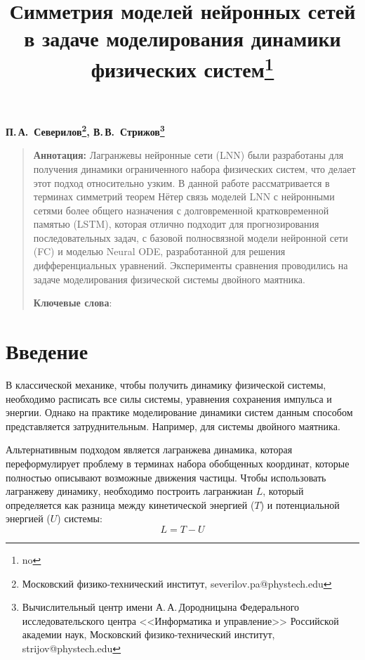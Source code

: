 \documentclass[12pt]{article}
\begin{document}
	\title{Симметрия моделей нейронных сетей в задаче моделирования динамики физических систем\thanks{no}}
	\date{}
	\author{}
	\maketitle
	
	\begin{center}
		\bf
		П.\,А.~Северилов\footnote{Московский физико-технический институт, severilov.pa@phystech.edu}, 
		В.\,В.~Стрижов\footnote{Вычислительный центр имени А.\,А.\,Дородницына Федерального исследовательского центра <<Информатика и управление>> Российской академии наук, Московский физико-технический институт, strijov@phystech.edu}
	\end{center}
	{\begin{quote}
			\textbf{Аннотация:}
			Лагранжевы нейронные сети (LNN) были разработаны для получения динамики ограниченного набора физических систем, что делает этот подход относительно узким. В данной работе рассматривается в терминах симметрий теорем Нётер связь моделей LNN с нейронными сетями более общего назначения с долговременной кратковременной памятью (LSTM), которая отлично подходит для прогнозирования последовательных задач, с базовой полносвязной модели нейронной сети (FC) и моделью Neural ODE, разработанной для решения дифференциальных уравнений. Эксперименты сравнения проводились на задаче моделирования физической системы двойного маятника. 
			
			\smallskip
			\textbf{Ключевые слова}: 
			\smallskip
			
		\end{quote}
	}

	
	\section{Введение}
	
	
	В классической механике, чтобы получить динамику физической системы, необходимо расписать все силы системы, уравнения сохранения импульса и энергии. Однако на практике моделирование динамики систем данным способом представляется затруднительным. Например, для системы двойного маятника.
	
	Альтернативным подходом является лагранжева динамика, которая переформулирует  проблему в терминах набора обобщенных координат, которые полностью описывают возможные движения частицы. Чтобы использовать лагранжеву динамику, необходимо построить лагранжиан $L$, который определяется как разница между кинетической энергией ($T$) и потенциальной энергией ($U$) системы:
	$$L = T - U $$
	
\end{document}
